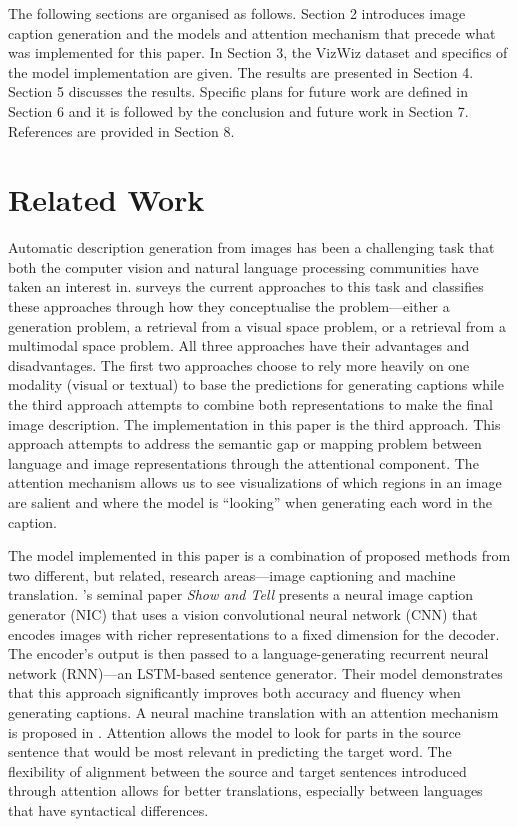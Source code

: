 \documentclass[11pt,a4paper]{article}
\begin{document}
The following sections are organised as follows. Section 2 introduces image caption generation and the models and attention mechanism that precede what was implemented for this paper. In Section 3, the VizWiz dataset and specifics of the model implementation are given. The results are presented in Section 4. Section 5 discusses the results. Specific plans for future work are defined in Section 6 and it is followed by the conclusion and future work in Section 7. References are provided in Section 8.

\section{Related Work}
Automatic description generation from images has been a challenging task that both the computer vision and natural language processing communities have taken an interest in. \citet{Bernardi-2016-automatic} surveys the current approaches to this task and classifies these approaches through how they conceptualise the problem—either a generation problem, a retrieval from a visual space problem, or a retrieval from a multimodal space problem. All three approaches have their advantages and disadvantages. The first two approaches choose to rely more heavily on one modality (visual or textual) to base the predictions for generating captions while the third approach attempts to combine both representations to make the final image description. The implementation in this paper is the third approach. This approach attempts to address the semantic gap or mapping problem between language and image representations through the attentional component. The attention mechanism allows us to see visualizations of which regions in an image are salient and where the model is “looking” when generating each word in the caption.

The model implemented in this paper is a combination of proposed methods from two different, but related, research areas—image captioning and machine translation. \citet{Vinyals-2014-showandtell}’s seminal paper \emph{Show and Tell} presents a neural image caption generator (NIC) that uses a vision convolutional neural network (CNN) that encodes images with richer representations to a fixed dimension for the decoder. The encoder’s output is then passed to a language-generating recurrent neural network (RNN)—an LSTM-based sentence generator. Their model demonstrates that this approach significantly improves both accuracy and fluency when generating captions. A neural machine translation with an attention mechanism is proposed in \citet{Bahdanau-2014-neural}. Attention allows the model to look for parts in the source sentence that would be most relevant in predicting the target word. The flexibility of alignment between the source and target sentences introduced through attention allows for better translations, especially between languages that have syntactical differences. 
\end{document}
